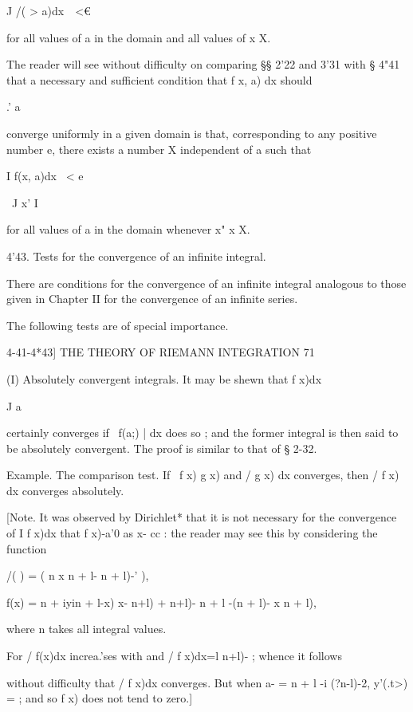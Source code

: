 J /( > a)dx\ \  <€ 

for all values of a in the domain and all values of x   X. 

The reader will see without difficulty on comparing §§ 2'22 and 3'31 with 
§ 4"41 that a necessary and sufficient condition that f  x, a) dx should 

.' a 

converge uniformly in a given domain is that, corresponding to any positive 
number e, there exists a number X independent of a such that 

I f(x, a)dx \ < e 

\ J x' I 

for all values of a in the domain whenever x"   x   X. 

4'43. Tests for the convergence of an infinite integral. 

There are conditions for the convergence of an infinite integral analogous 
to those given in Chapter II for the convergence of an infinite series. 

The following tests are of special importance. 






4-41-4*43] THE THEORY OF RIEMANN INTEGRATION 71 



(I) Absolutely convergent integrals. It may be shewn that f x)dx 

J a 

certainly converges if \ f(a;) | dx does so ; and the former integral is then 
said to be absolutely convergent. The proof is similar to that of § 2-32. 

Example. The comparison test. If \ f x)  g x) and / g  x) dx converges, then 
/ f x) dx converges absolutely. 

[Note. It was observed by Dirichlet* that it is not necessary for the convergence of 
I f x)dx that f x)-a'0 as x- cc : the reader may see this by considering the function 

/( ) = ( n x n + l- n + l)-' ), 

f(x) =  n + iyin + l-x) x- n+l) +  n+l)-    n + l -(n + l)- x n + l), 

where n takes all integral values. 

For / f(x)dx increa.'ses with   and / f x)dx=l n+l)-  ; whence it follows 

without difficulty that / f x)dx converges. But when a- = n + l -i (?n-l)-2, y'(.t>) =   ; 
and so f x) does not tend to zero.] 

